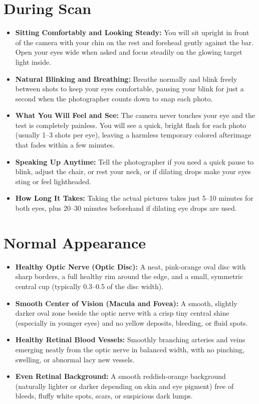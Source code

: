 \section{During Scan}

\begin{itemize}
    \item \textbf{Sitting Comfortably and Looking Steady:} You will sit upright in front of the camera with your chin on the rest and forehead gently against the bar. Open your eyes wide when asked and focus steadily on the glowing target light inside.
    \item \textbf{Natural Blinking and Breathing:} Breathe normally and blink freely between shots to keep your eyes comfortable, pausing your blink for just a second when the photographer counts down to snap each photo.
    \item \textbf{What You Will Feel and See:} The camera never touches your eye and the test is completely painless. You will see a quick, bright flash for each photo (usually 1--3 shots per eye), leaving a harmless temporary colored afterimage that fades within a few minutes.
    \item \textbf{Speaking Up Anytime:} Tell the photographer if you need a quick pause to blink, adjust the chair, or rest your neck, or if dilating drops make your eyes sting or feel lightheaded.
    \item \textbf{How Long It Takes:} Taking the actual pictures takes just 5--10 minutes for both eyes, plus 20--30 minutes beforehand if dilating eye drops are used.
\end{itemize}

\section{Normal Appearance}

\begin{itemize}
    \item \textbf{Healthy Optic Nerve (Optic Disc):} A neat, pink-orange oval disc with sharp borders, a full healthy rim around the edge, and a small, symmetric central cup (typically 0.3--0.5 of the disc width).
    \item \textbf{Smooth Center of Vision (Macula and Fovea):} A smooth, slightly darker oval zone beside the optic nerve with a crisp tiny central shine (especially in younger eyes) and no yellow deposits, bleeding, or fluid spots.
    \item \textbf{Healthy Retinal Blood Vessels:} Smoothly branching arteries and veins emerging neatly from the optic nerve in balanced width, with no pinching, swelling, or abnormal lacy new vessels.
    \item \textbf{Even Retinal Background:} A smooth reddish-orange background (naturally lighter or darker depending on skin and eye pigment) free of bleeds, fluffy white spots, scars, or suspicious dark lumps.
\end{itemize}

